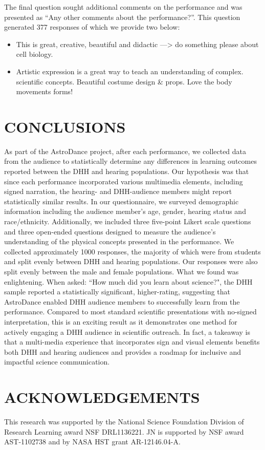 \documentclass[11.5pt]{sig-alternate} %
\begin{document}
\begin{large}
The final question sought additional comments on the performance and was presented as “Any other comments about the performance?”.  This question generated 377 responses of which we provide two below:

\begin{itemize}
    \item This is great, creative, beautiful and didactic —> do something please about cell biology.
    \item Artistic expression is a great way to teach an understanding of complex. scientific concepts. Beautiful costume design \& props. Love the body movements forms!
\end{itemize}

\section*{CONCLUSIONS}

As part of the AstroDance project, after each performance, we collected data from the audience to statistically determine any differences in learning outcomes reported between the DHH and hearing populations.  Our hypothesis was that since each performance incorporated various multimedia elements, including signed narration, the hearing- and DHH-audience members might report statistically similar results.  In our questionnaire, we surveyed demographic information including the audience member's age, gender, hearing status and race/ethnicity. Additionally, we included three five-point Likert scale questions and three open-ended questions designed to measure the audience’s understanding of the physical concepts presented in the performance. We collected approximately 1000 responses, the majority of which were from students and split evenly between DHH and hearing populations. Our responses were also split evenly between the male and female populations. What we found was enlightening. When asked: “How much did you learn about science?", the DHH sample reported a statistically significant, higher-rating, suggesting that AstroDance enabled DHH audience members to successfully learn from the performance. Compared to most standard scientific presentations with no-signed interpretation, this is an exciting result as it demonstrates one method for actively engaging a DHH audience in scientific outreach.  In fact, a takeaway is that a multi-media experience that incorporates sign and visual elements benefits both DHH and hearing audiences and provides a roadmap for inclusive and impactful science communication.  

\section*{ACKNOWLEDGEMENTS}
This research was supported by the National Science Foundation Division of Research Learning award NSF DRL1136221. JN is supported by NSF award AST-1102738 and by NASA HST grant AR-12146.04-A.

\end{large}
\clearpage
\end{document}
